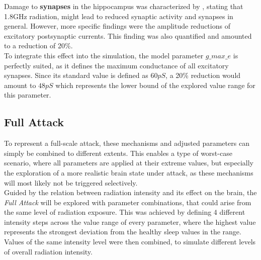     Damage to \textbf{synapses} in the hippocampus was characterized by \textcite{Xu.2006}, stating that 1.8GHz radiation, might lead to reduced synaptic activity and synapses in general. However, more specific findings were the amplitude reductions of excitatory postsynaptic currents. This finding was also quantified and amounted to a reduction of 20\%.\\
    To integrate this effect into the simulation, the model parameter \(g\_max\_e\) is perfectly suited, as it defines the maximum conductance of all excitatory synapses. Since its standard value is defined as \(60pS\), a 20\% reduction would amount to \(48pS\) which represents the lower bound of the explored value range for this parameter. 



    \subsection{Full Attack}
    To represent a full-scale attack, these mechanisms and adjusted parameters can simply be combined to different extents. This enables a type of worst-case scenario, where all parameters are applied at their extreme values, but especially the exploration of a more realistic brain state under attack, as these mechanisms will most likely not be triggered selectively.\\
    Guided by the relation between radiation intensity and its effect on the brain, the \textit{Full Attack} will be explored with parameter combinations, that could arise from the same level of radiation exposure. This was achieved by defining 4 different intensity steps across the value range of every parameter, where the highest value represents the strongest deviation from the healthy sleep values in the range. Values of the same intensity level were then combined, to simulate different levels of overall radiation intensity. 


